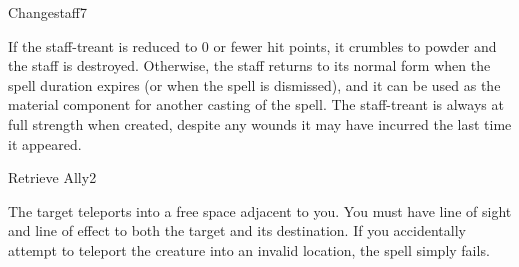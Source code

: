 \begin{spellfooter}
\begin{spellsection}{Changestaff}{7}
\begin{spellcontent}
\begin{spelleffects}
            If the staff-treant is reduced to 0 or fewer hit points, it crumbles to powder and the staff is destroyed. Otherwise, the staff returns to its normal form when the spell duration expires (or when the spell is dismissed), and it can be used as the material component for another casting of the spell. The staff-treant is always at full strength when created, despite any wounds it may have incurred the last time it appeared.
            \spelldur \durmed \dismissable
        \end{spelleffects}
    \end{spellcontent}
    \begin{spellfooter}
    \end{spellfooter}
\end{spellsection}

\begin{spellsection}{Retrieve Ally}{2}
    \begin{spellheader}
    \end{spellheader}
    \begin{spellcontent}
        \begin{spelltargetinginfo}
        \end{spelltargetinginfo}
        \begin{spelleffects}
            \spelleffect The target teleports into a free space adjacent to you. You must have line of sight and line of effect to both the target and its destination. If you accidentally attempt to teleport the creature into an invalid location, the spell simply fails.
        \end{spelleffects}
    \end{spellcontent}
    \begin{spellfooter}
    \end{spellfooter}
\end{spellsection}


\end{spellfooter}
